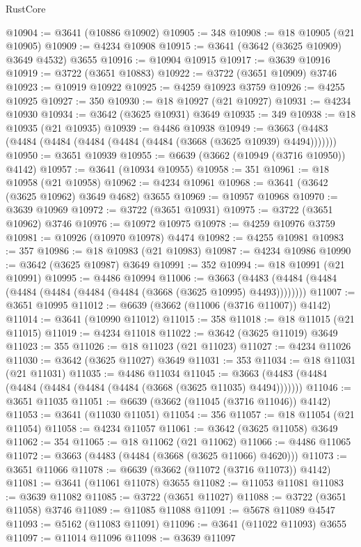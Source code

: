 \begin{lexlean}{RustCore}
\begin{coremodule}
@10904 := @3641 (@10886 @10902)
@10905 := 348
@10908 := @18 @10905 (@21 @10905)
@10909 := @4234 @10908
@10915 := @3641 (@3642 (@3625 @10909) @3649 @4532) @3655
@10916 := @10904 @10915
@10917 := @3639 @10916
@10919 := @3722 (@3651 @10883)
@10922 := @3722 (@3651 @10909) @3746
@10923 := @10919 @10922
@10925 := @4259 @10923 @3759
@10926 := @4255 @10925
@10927 := 350
@10930 := @18 @10927 (@21 @10927)
@10931 := @4234 @10930
@10934 := @3642 (@3625 @10931) @3649
@10935 := 349
@10938 := @18 @10935 (@21 @10935)
@10939 := @4486 @10938
@10949 := @3663 (@4483 (@4484 (@4484 (@4484 (@4484 (@4484 (@3668 (@3625 @10939) @4494)))))))
@10950 := @3651 @10939
@10955 := @6639 (@3662 (@10949 (@3716 @10950)) @4142)
@10957 := @3641 (@10934 @10955)
@10958 := 351
@10961 := @18 @10958 (@21 @10958)
@10962 := @4234 @10961
@10968 := @3641 (@3642 (@3625 @10962) @3649 @4682) @3655
@10969 := @10957 @10968
@10970 := @3639 @10969
@10972 := @3722 (@3651 @10931)
@10975 := @3722 (@3651 @10962) @3746
@10976 := @10972 @10975
@10978 := @4259 @10976 @3759
@10981 := @10926 (@10970 @10978) @4474
@10982 := @4255 @10981
@10983 := 357
@10986 := @18 @10983 (@21 @10983)
@10987 := @4234 @10986
@10990 := @3642 (@3625 @10987) @3649
@10991 := 352
@10994 := @18 @10991 (@21 @10991)
@10995 := @4486 @10994
@11006 := @3663 (@4483 (@4484 (@4484 (@4484 (@4484 (@4484 (@4484 (@3668 (@3625 @10995) @4493))))))))
@11007 := @3651 @10995
@11012 := @6639 (@3662 (@11006 (@3716 @11007)) @4142)
@11014 := @3641 (@10990 @11012)
@11015 := 358
@11018 := @18 @11015 (@21 @11015)
@11019 := @4234 @11018
@11022 := @3642 (@3625 @11019) @3649
@11023 := 355
@11026 := @18 @11023 (@21 @11023)
@11027 := @4234 @11026
@11030 := @3642 (@3625 @11027) @3649
@11031 := 353
@11034 := @18 @11031 (@21 @11031)
@11035 := @4486 @11034
@11045 := @3663 (@4483 (@4484 (@4484 (@4484 (@4484 (@4484 (@3668 (@3625 @11035) @4494)))))))
@11046 := @3651 @11035
@11051 := @6639 (@3662 (@11045 (@3716 @11046)) @4142)
@11053 := @3641 (@11030 @11051)
@11054 := 356
@11057 := @18 @11054 (@21 @11054)
@11058 := @4234 @11057
@11061 := @3642 (@3625 @11058) @3649
@11062 := 354
@11065 := @18 @11062 (@21 @11062)
@11066 := @4486 @11065
@11072 := @3663 (@4483 (@4484 (@3668 (@3625 @11066) @4620)))
@11073 := @3651 @11066
@11078 := @6639 (@3662 (@11072 (@3716 @11073)) @4142)
@11081 := @3641 (@11061 @11078) @3655
@11082 := @11053 @11081
@11083 := @3639 @11082
@11085 := @3722 (@3651 @11027)
@11088 := @3722 (@3651 @11058) @3746
@11089 := @11085 @11088
@11091 := @5678 @11089 @4547
@11093 := @5162 (@11083 @11091)
@11096 := @3641 (@11022 @11093) @3655
@11097 := @11014 @11096
@11098 := @3639 @11097

\end{coremodule}
\end{lexlean}
